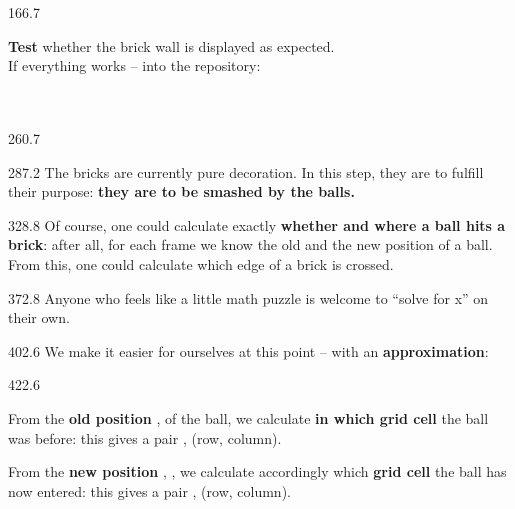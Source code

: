 \documentclass{aslab}
\begin{document}
\begin{region}[pitch=13.45]{166.7}
\begin{ntasks}[start=2]
\item \textbf{Test} whether the brick wall is displayed as expected.\\
  If everything works -- into the repository:\\
  \\
  \\
\end{ntasks}
\end{region}

\begin{region}{260.7}
\end{region}

\begin{region}[pitch=14.1]{287.2}
The bricks are currently pure decoration. In this step, they are to fulfill
their purpose: \textbf{they are to be smashed by the balls.}
\end{region}

\begin{region}[pitch=13.25]{328.8}
Of course, one could calculate exactly \textbf{whether and where a ball hits a
brick}: after all, for each frame we know the old and the new position of a
ball. From this, one could calculate which edge of a brick is crossed.
\end{region}

\begin{region}{372.8}
 Anyone who feels like a little math puzzle is welcome to
``solve for x'' on their own.
\end{region}

\begin{region}{402.6}
We make it easier for ourselves at this point -- with an
\textbf{approximation}:
\end{region}

\begin{region}[pitch=14.3]{422.6}
\begin{dashlist}
\item From the \textbf{old position} ,  of the ball, we
  calculate \textbf{in which grid cell} the ball was before: this gives a pair
  ,  (row, column).
\item From the \textbf{new position} , , we calculate
  accordingly which \textbf{grid cell} the ball has now entered: this gives a
  pair ,  (row, column).
\end{dashlist}
\end{region}
\end{document}
